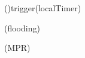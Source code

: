 
\begin{algorithm}
	\footnotesize
	\DontPrintSemicolon
	
		
		\Fn(){trigger(localTimer)}{
			{
				{
					\FuncSwitch (flooding)\;
				}
				
			}{
				{
					\FuncSwitch (MPR)\;
				}
			}
		}


\caption{Local Policy}
\end{algorithm}